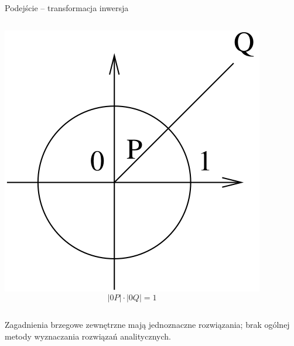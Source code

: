 \begin{frame}
  Podejście -- transformacja inwersja
  \begin{columns}
      \includegraphics[width = \linewidth]{img/23/inwersja}
      $$|0P| \cdot |0Q| = 1$$
  \end{columns}

  \vspace{5px}

  Zagadnienia brzegowe zewnętrzne mają jednoznaczne rozwiązania; brak ogólnej metody wyznaczania rozwiązań analitycznych.
\end{frame}
